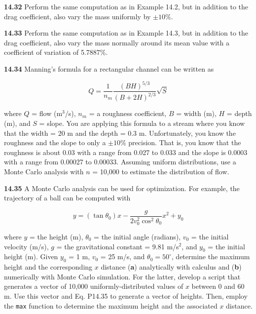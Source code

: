 \documentclass[../main.tex]{subfiles}
\begin{document}
\begin{multicols}{2}
	\noindent\textbf{14.32} Perform the same computation as in Example 14.2,
	but in addition to the drag coefficient, also vary the mass
	uniformly by $\pm 10\%$.

	\noindent\textbf{14.33} Perform the same computation as in Example 14.3,
	but in addition to the drag coefficient, also vary the mass
	normally around its mean value with a coefficient of variation of 5.7887\%.

	\noindent\textbf{14.34}  Manning's formula for a rectangular channel can be
	written as

	$$Q = \frac{1}{n_m} \frac{(BH) ^ {5/3}}{(B+2H) ^ {2/3}} \sqrt{S}$$

	\noindent where $Q$ = flow (m$^3$/s), $n_m$ = a roughness coefficient, $B$ =
	width (m), $H$ = depth (m), and $S$ = slope. You are applying
	this formula to a stream where you know that the width = 20 m
	and the depth = 0.3 m. Unfortunately, you know the roughness and the slope to only a $\pm 10\%$ precision. That is, you
	know that the roughness is about 0.03 with a range from 0.027
	to 0.033 and the slope is 0.0003 with a range from 0.00027
	to 0.00033. Assuming uniform distributions, use a Monte
	Carlo analysis with $n$ = 10,000 to estimate the distribution
	of flow.

	\noindent\textbf{14.35} A Monte Carlo analysis can be used for optimization.
	For example, the trajectory of a ball can be computed with

	\begin{equation}
		\tag{P14.35}
		y = (\tan \theta_0)x - \frac{g}{2 v^2_0 \cos ^2 \theta_0} x^2 + y_0
	\end{equation}

	\noindent where $y$ = the height (m), $\theta_0$ = the initial angle (radians),
	$v_0$ = the initial velocity (m/s), $g$ = the gravitational constant =
	9.81 m/s$^2$, and $y_0$ = the initial height (m). Given $y_0$ = 1 m,
	$v_0$ = 25 m/s, and $\theta_0 = 50^\circ$, determine the maximum height
	and the corresponding $x$ distance (\textbf{a}) analytically with calculus and (\textbf{b}) numerically with Monte Carlo simulation. For
	the latter, develop a script that generates a vector of 10,000
	uniformly-distributed values of $x$ between 0 and 60 m. Use
	this vector and Eq. P14.35 to generate a vector of heights.
	Then, employ the \texttt{max} function to determine the maximum
	height and the associated $x$ distance.
\end{multicols}
\end{document}
